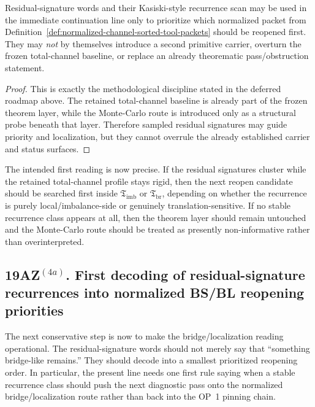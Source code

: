 \begin{proposition}
\label{prop:conservative-monte-carlo-qam-probe-rule}
Residual-signature words and their Kasiski-style recurrence scan may be used in the immediate continuation line only to prioritize which normalized packet from Definition~\ref{def:normalized-channel-sorted-tool-packets} should be reopened first. They may \emph{not} by themselves introduce a second primitive carrier, overturn the frozen total-channel baseline, or replace an already theorematic pass/obstruction statement.
\end{proposition}

\begin{proof}
This is exactly the methodological discipline stated in the deferred roadmap above. The retained total-channel baseline is already part of the frozen theorem layer, while the Monte-Carlo route is introduced only as a structural probe beneath that layer. Therefore sampled residual signatures may guide priority and localization, but they cannot overrule the already established carrier and status surfaces.
\end{proof}

\begin{remark}
\label{rem:immediate-diagnostic-reading-signatures}
The intended first reading is now precise. If the residual signatures cluster while the retained total-channel profile stays rigid, then the next reopen candidate should be searched first inside \(\mathfrak T_{\mathrm{imb}}\) or \(\mathfrak T_{\mathrm{br}}\), depending on whether the recurrence is purely local/imbalance-side or genuinely translation-sensitive. If no stable recurrence class appears at all, then the theorem layer should remain untouched and the Monte-Carlo route should be treated as presently non-informative rather than overinterpreted.
\end{remark}


\subsection*{19AZ$^{(4a)}$. First decoding of residual-signature recurrences into normalized BS/BL reopening priorities}
\label{sec:first-decoding-of-signature-recurrences-into-bs-bl-priorities}
The next conservative step is now to make the bridge/localization reading operational. The residual-signature words should not merely say that ``something bridge-like remains.'' They should decode into a smallest prioritized reopening order. In particular, the present line needs one first rule saying when a stable recurrence class should push the next diagnostic pass onto the normalized bridge/localization route rather than back into the OP~1 pinning chain.

